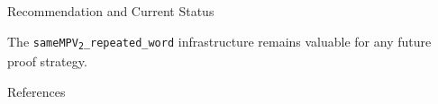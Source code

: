 \documentclass[aspectratio=169,10pt]{beamer}
\begin{document}
\begin{frame}{Recommendation and Current Status}
\vspace{0.5em}
\begin{center}
\textcolor{dimwhite}{\footnotesize%
The \texttt{sameMPV\textsubscript{2}\_repeated\_word} infrastructure remains valuable
for any future proof strategy.}
\end{center}
\end{frame}

\begin{frame}[allowframebreaks]{References}

\end{frame}
\end{document}

